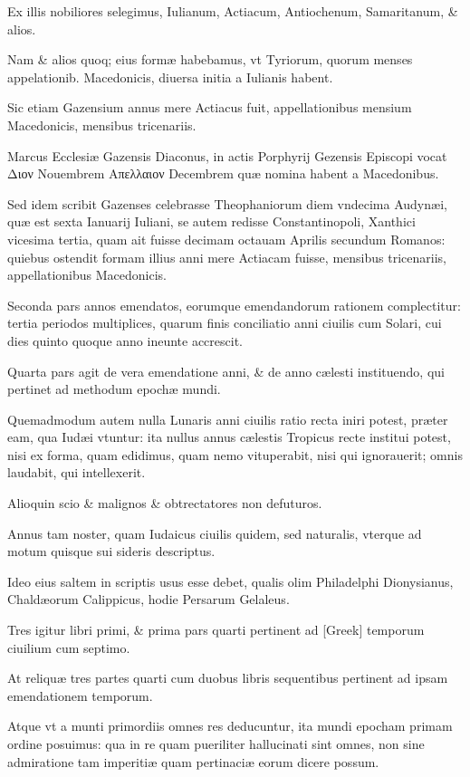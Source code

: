 \begin{parnumbers}
Ex illis nobiliores selegimus, Iulianum, Actiacum, Antiochenum, Samaritanum, \& alios. 

Nam \& alios quoq; eius formæ habebamus, vt Tyriorum, quorum menses appelationib. Macedonicis, diuersa initia a Iulianis habent.

Sic etiam Gazensium annus mere Actiacus fuit, appellationibus mensium Macedonicis, mensibus tricenariis. 

Marcus Ecclesiæ Gazensis Diaconus, in actis Porphyrij Gezensis Episcopi vocat \textgreek{Διον} Nouembrem \textgreek{Απελλαιον} Decembrem quæ nomina habent a Macedonibus. 

Sed idem scribit Gazenses celebrasse Theophaniorum diem vndecima Audynæi, quæ est sexta Ianuarij Iuliani, se autem redisse Constantinopoli, Xanthici vicesima tertia, quam ait fuisse decimam octauam Aprilis secundum Romanos: quiebus ostendit formam illius anni mere Actiacam fuisse, mensibus tricenariis, appellationibus Macedonicis. 

Seconda pars annos emendatos, eorumque emendandorum
rationem complectitur: tertia periodos multiplices, quarum finis conciliatio anni ciuilis cum Solari, cui dies quinto quoque anno ineunte accrescit.

Quarta pars agit de vera emendatione anni, \& de anno cælesti instituendo, qui pertinet ad methodum epochæ mundi.

Quemadmodum autem nulla Lunaris anni ciuilis ratio recta iniri potest, præter eam, qua Iudæi vtuntur: ita nullus annus cælestis Tropicus recte institui potest, nisi ex forma, quam edidimus, quam nemo vituperabit, nisi qui ignorauerit; omnis laudabit, qui intellexerit.

Alioquin scio \& malignos \& obtrectatores non defuturos. 

Annus tam noster, quam Iudaicus ciuilis quidem, sed naturalis, vterque ad motum quisque sui sideris descriptus. 

Ideo eius saltem in scriptis usus esse debet, qualis olim Philadelphi Dionysianus, Chaldæorum Calippicus, hodie Persarum Gelaleus. 

Tres igitur libri primi, \& prima pars quarti pertinent ad \textgreek{[Greek]} temporum ciuilium cum septimo.

At reliquæ tres partes quarti cum duobus libris sequentibus pertinent ad ipsam emendationem temporum.

Atque vt a munti primordiis omnes res deducuntur, ita mundi epocham primam ordine posuimus: qua in re quam pueriliter hallucinati sint omnes, non sine admiratione tam imperitiæ quam pertinaciæ eorum dicere possum.


\end{parnumbers}

